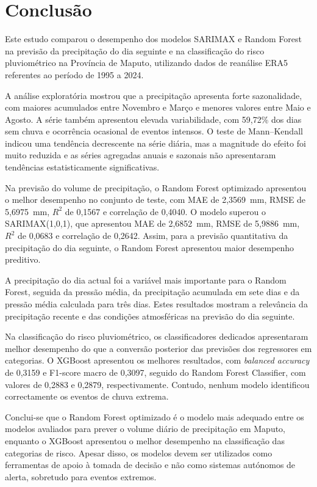 \documentclass[9pt,twocolumn,twoside,english,portuguese]{opticajnl}
\begin{document}
\section{Conclusão}

Este estudo comparou o desempenho dos modelos SARIMAX e Random Forest na
previsão da precipitação do dia seguinte e na classificação do risco
pluviométrico na Província de Maputo, utilizando dados de reanálise ERA5
referentes ao período de 1995 a 2024.

A análise exploratória mostrou que a precipitação apresenta forte
sazonalidade, com maiores acumulados entre Novembro e Março e menores
valores entre Maio e Agosto. A série também apresentou elevada variabilidade,
com 59,72\% dos dias sem chuva e ocorrência ocasional de eventos intensos.
O teste de Mann--Kendall indicou uma tendência decrescente na série diária,
mas a magnitude do efeito foi muito reduzida e as séries agregadas anuais e
sazonais não apresentaram tendências estatisticamente significativas.

Na previsão do volume de precipitação, o Random Forest optimizado apresentou
o melhor desempenho no conjunto de teste, com MAE de 2,3569~mm, RMSE de
5,6975~mm, $R^2$ de 0,1567 e correlação de 0,4040. O modelo superou o
SARIMAX(1,0,1), que apresentou MAE de 2,6852~mm, RMSE de 5,9886~mm,
$R^2$ de 0,0683 e correlação de 0,2642. Assim, para a previsão quantitativa
da precipitação do dia seguinte, o Random Forest apresentou maior desempenho
preditivo.

A precipitação do dia actual foi a variável mais importante para o Random
Forest, seguida da pressão média, da precipitação acumulada em sete dias e
da pressão média calculada para três dias. Estes resultados mostram a
relevância da precipitação recente e das condições atmosféricas na previsão
do dia seguinte.

Na classificação do risco pluviométrico, os classificadores dedicados
apresentaram melhor desempenho do que a conversão posterior das previsões
dos regressores em categorias. O XGBoost apresentou os melhores resultados,
com \textit{balanced accuracy} de 0,3159 e F1-score macro de 0,3097,
seguido do Random Forest Classifier, com valores de 0,2883 e 0,2879,
respectivamente. Contudo, nenhum modelo identificou correctamente os
eventos de chuva extrema.

Conclui-se que o Random Forest optimizado é o modelo mais adequado entre os
modelos avaliados para prever o volume diário de precipitação em Maputo,
enquanto o XGBoost apresentou o melhor desempenho na classificação das
categorias de risco. Apesar disso, os modelos devem ser utilizados como
ferramentas de apoio à tomada de decisão e não como sistemas autónomos de
alerta, sobretudo para eventos extremos.
\end{document}
